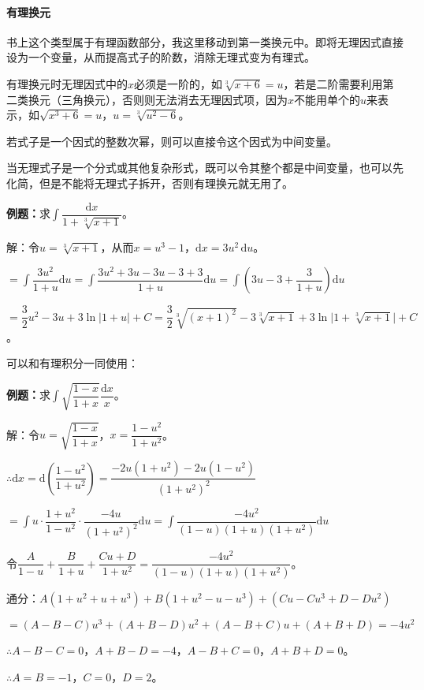 \documentclass[UTF8, 12pt]{ctexart}
\begin{document}
\paragraph{有理换元} \leavevmode \medskip

书上这个类型属于有理函数部分，我这里移动到第一类换元中。即将无理因式直接设为一个变量，从而提高式子的阶数，消除无理式变为有理式。

有理换元时无理因式中的$x$必须是一阶的，如$\sqrt[3]{x+6}=u$，若是二阶需要利用第二类换元（三角换元），否则则无法消去无理因式项，因为$x$不能用单个的$u$来表示，如$\sqrt{x^3+6}=u$，$u=\sqrt[3]{u^2-6}$。

若式子是一个因式的整数次幂，则可以直接令这个因式为中间变量。

当无理式子是一个分式或其他复杂形式，既可以令其整个都是中间变量，也可以先化简，但是不能将无理式子拆开，否则有理换元就无用了。

\textbf{例题：}求$\displaystyle{\int\dfrac{\textrm{d}x}{1+\sqrt[3]{x+1}}}$。

解：令$u=\sqrt[3]{x+1}$，从而$x=u^3-1$，$\textrm{d}x=3u^2\,\textrm{d}u$。

$=\displaystyle{\int\dfrac{3u^2}{1+u}\textrm{d}u=\int\dfrac{3u^2+3u-3u-3+3}{1+u}\textrm{d}u=\int\left(3u-3+\dfrac{3}{1+u}\right)\textrm{d}u}$

$=\dfrac{3}{2}u^2-3u+3\ln\vert1+u\vert+C=\dfrac{3}{2}\sqrt[3]{(x+1)^2}-3\sqrt[3]{x+1}+3\ln\vert1+\sqrt[3]{x+1}\vert+C$。

可以和有理积分一同使用：\medskip

\textbf{例题：}求$\displaystyle{\int\sqrt{\dfrac{1-x}{1+x}}\dfrac{\textrm{d}x}{x}}$。\medskip

解：令$u=\sqrt{\dfrac{1-x}{1+x}}$，$x=\dfrac{1-u^2}{1+u^2}$。

$\therefore\textrm{d}x=\textrm{d}\left(\dfrac{1-u^2}{1+u^2}\right)=\dfrac{-2u(1+u^2)-2u(1-u^2)}{(1+u^2)^2}$

$=\displaystyle{\int u\cdot\dfrac{1+u^2}{1-u^2}\cdot\dfrac{-4u}{(1+u^2)^2}\textrm{d}u=\int\dfrac{-4u^2}{(1-u)(1+u)(1+u^2)}\textrm{d}u}$

令$\dfrac{A}{1-u}+\dfrac{B}{1+u}+\dfrac{Cu+D}{1+u^2}=\dfrac{-4u^2}{(1-u)(1+u)(1+u^2)}$。

通分：$A(1+u^2+u+u^3)+B(1+u^2-u-u^3)+(Cu-Cu^3+D-Du^2)$

$=(A-B-C)u^3+(A+B-D)u^2+(A-B+C)u+(A+B+D)=-4u^2$

$\therefore A-B-C=0$，$A+B-D=-4$，$A-B+C=0$，$A+B+D=0$。

$\therefore A=B=-1$，$C=0$，$D=2$。
\end{document}
